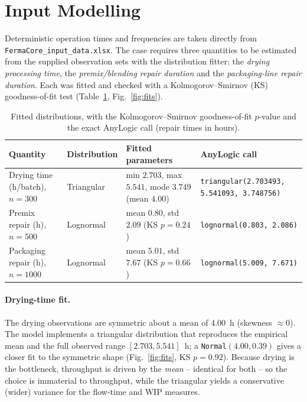\section{Input Modelling}
\label{sec:input}

Deterministic operation times and frequencies are taken directly from
\texttt{FermaCore\_input\_data.xlsx}. The case requires three quantities to be
estimated from the supplied observation sets with the distribution fitter: the
\emph{drying processing time}, the \emph{premix/blending repair duration} and
the \emph{packaging-line repair duration}. Each was fitted and checked with a
Kolmogorov--Smirnov (KS) goodness-of-fit test (Table~\ref{tab:fits},
Fig.~\ref{fig:fits}).

\begin{table}[H]
\centering
\caption{Fitted distributions, with the Kolmogorov--Smirnov goodness-of-fit
$p$-value and the exact AnyLogic call (repair times in hours).}
\label{tab:fits}
\begin{tabularx}{\textwidth}{l l l X}
\toprule
\textbf{Quantity} & \textbf{Distribution} & \textbf{Fitted parameters} & \textbf{AnyLogic call} \\
\midrule
Drying time (h/batch), $n{=}300$      & Triangular & min $2.703$, max $5.541$, mode $3.749$ (mean $4.00$) & \texttt{triangular(2.703493,} \texttt{5.541093, 3.748756)} \\
Premix repair (h), $n{=}500$          & Lognormal  & mean $0.80$, std $2.09$ (KS $p=0.24$) & \texttt{lognormal(0.803, 2.086)} \\
Packaging repair (h), $n{=}1000$      & Lognormal  & mean $5.01$, std $7.67$ (KS $p=0.66$) & \texttt{lognormal(5.009, 7.671)} \\
\bottomrule
\end{tabularx}
\end{table}

\paragraph{Drying-time fit.} The drying observations are symmetric about a mean
of \SI{4.00}{h} (skewness $\approx 0$). The model implements a triangular
distribution that reproduces the empirical mean and the full observed range
$[2.703,5.541]$~h; a \texttt{Normal}$(4.00,0.39)$ gives a closer fit to the
symmetric shape (Fig.~\ref{fig:fits}, KS $p=0.92$). Because drying is the
bottleneck, throughput is driven by the \emph{mean} -- identical for both -- so
the choice is immaterial to throughput, while the triangular yields a
conservative (wider) variance for the flow-time and WIP measures.

